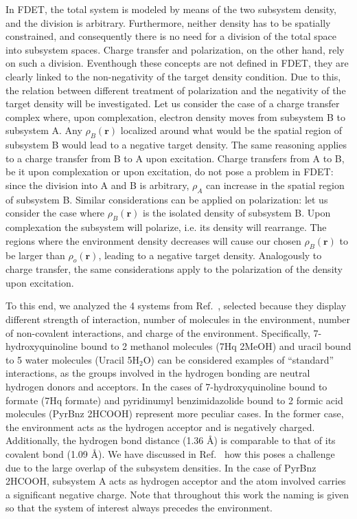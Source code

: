 \documentclass[journal=jctcce,manuscript=article, layout=twocolumn]{achemso}
\begin{document}
In FDET, the total system is modeled by means of the two subsystem density, and the division is arbitrary. Furthermore, neither density has to be spatially constrained, and consequently there is no need for a division of the total space into subsystem spaces. Charge transfer and polarization, on the other hand, rely on such a division. Eventhough these concepts are not defined in FDET, they are clearly linked to the non-negativity of the target density condition. Due to this, the relation between different treatment of polarization and the negativity of the target density will be investigated.
Let us consider the case of a charge transfer complex where, upon complexation, electron density moves from subsystem B to subsystem A. Any $\rho_B(\mathbf{r})$ localized around what would be the spatial region of subsystem B would lead to a negative target density. The same reasoning applies to a charge transfer from B to A upon excitation.
Charge transfers from A to B, be it upon complexation or upon excitation, do not pose a problem in FDET: since the division into A and B is arbitrary, $\rho_A$ can increase in the spatial region of subsystem B.
Similar considerations can be applied on polarization: let us consider the case where $\rho_B(\mathbf{r})$ is the isolated density of subsystem B. Upon complexation the subsystem will polarize, i.e. its density will rearrange. The regions where the environment density decreases will cause our chosen $\rho_B(\mathbf{r})$ to be larger than $\rho_o(\mathbf{r})$, leading to a negative target density. Analogously to charge transfer, the same considerations apply to the polarization of the density upon excitation.

To this end, we analyzed the 4 systems from Ref.~, selected because they display different strength of interaction, number of molecules in the environment, number of non-covalent interactions, and charge of the environment.
Specifically, 7-hydroxyquinoline bound to 2 methanol molecules (7Hq 2MeOH) and uracil bound to 5 water molecules (Uracil 5H$_2$O) can be considered examples of ``standard'' interactions, as the groups involved in the hydrogen bonding are neutral hydrogen donors and acceptors. In the cases of 7-hydroxyquinoline bound to formate (7Hq formate) and pyridinumyl benzimidazolide bound to 2 formic acid molecules (PyrBnz 2HCOOH) represent more peculiar cases. In the former case, the environment acts as the hydrogen acceptor and is negatively charged. Additionally, the hydrogen bond distance (1.36 \AA) is comparable to that of its covalent bond (1.09 \AA). We have discussed in Ref.~ how this poses a challenge due to the large overlap of the subsystem densities. In the case of PyrBnz 2HCOOH, subsystem A acts as hydrogen acceptor and the atom involved carries a significant negative charge.
Note that throughout this work the naming is given so that the system of interest always precedes the environment.
\end{document}

